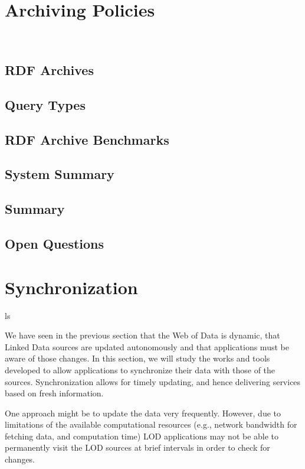 \documentclass[sw]{iosart2x}
\begin{document}
\section{Archiving Policies}\label{Archiving}
~\cite{SandersonS12,Papastefanatos13,MeimarisPPGS14}

\subsection{RDF Archives}\label{Archives}
\subsection{Query Types}\label{Types}
\subsection{RDF Archive Benchmarks}\label{Benchmarks}
\subsection{System Summary}\label{System3}
\subsection{Summary}\label{Summary3}
\subsection{Open Questions}\label{Open3}


\section{Synchronization}\label{Index}ls

We have seen in the previous section that the Web of Data is dynamic, that Linked Data sources are updated autonomously and that applications must be aware of those changes. In this section, we will study the works and tools developed to allow applications to synchronize their data with those of the sources. Synchronization allows for timely updating, and hence delivering services based on fresh information.

One approach might be to update the data very frequently. However, due to limitations of the available computational resources (e.g., network bandwidth for fetching data, and computation time) LOD applications may not be able to permanently visit the LOD sources at brief intervals in order to check for changes.
\end{document}
